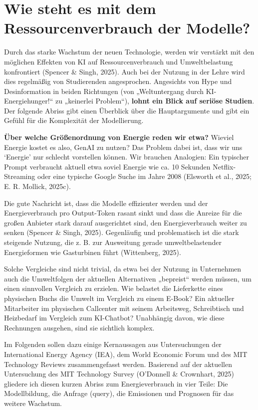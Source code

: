 \documentclass[
  ngerman,
  letterpaper,
  DIV=11]{scrreprt}
\begin{document}
\section{Wie steht es mit dem Ressourcenverbrauch der
Modelle?}\label{sec-energy}

Durch das starke Wachstum der neuen Technologie, werden wir verstärkt
mit den möglichen Effekten von KI auf Ressourcenverbrauch und
Umweltbelastung konfrontiert (Spencer \& Singh, 2025). Auch bei der
Nutzung in der Lehre wird dies regelmäßig von Studierenden angesprochen.
Angesichts von Hype und Desinformation in beiden Richtungen (von
„Weltuntergang durch KI-Energiehunger!{}`` zu „keinerlei Problem``),
\textbf{lohnt ein Blick auf seriöse Studien}. Der folgende Abriss gibt
einen Überblick über die Hauptargumente und gibt ein Gefühl für die
Komplexität der Modellierung.

\textbf{Über welche Größenordnung von Energie reden wir etwa?} Wieviel
Energie kostet es also, GenAI zu nutzen? Das Problem dabei ist, dass wir
uns `Energie' nur schlecht vorstellen können. Wir brauchen Analogien:
Ein typischer Prompt verbraucht aktuell etwa soviel Energie wie ca. 10
Sekunden Netflix-Streaming oder eine typische Google Suche im Jahre 2008
(Elsworth et al., 2025; E. R. Mollick, 2025c).

Die gute Nachricht ist, dass die Modelle effizienter werden und der
Energieverbrauch pro Output-Token rasant sinkt und dass die Anreize für
die großen Anbieter stark darauf ausgerichtet sind, den Energieverbrauch
weiter zu senken (Spencer \& Singh, 2025). Gegenläufig und problematisch
ist die stark steigende Nutzung, die z. B. zur Ausweitung gerade
umweltbelastender Energieformen wie Gasturbinen führt (Wittenberg,
2025).

Solche Vergleiche sind nicht trivial, da etwa bei der Nutzung in
Unternehmen auch die Umweltfolgen der aktuellen Alternativen „bepreist``
werden müssen, um einen sinnvollen Vergleich zu erzielen. Wie belastet
die Lieferkette eines physischen Buchs die Umwelt im Vergleich zu einem
E-Book? Ein aktueller Mitarbeiter im physischen Callcenter mit seinem
Arbeitsweg, Schreibtisch und Heizbedarf im Vergleich zum KI-Chatbot?
Unabhängig davon, wie diese Rechnungen ausgehen, sind sie sichtlich
komplex.

Im Folgenden sollen dazu einige Kernaussagen aus Untersuchungen der
International Energy Agency (IEA), dem World Economic Forum und des MIT
Technology Reviews zusammengefasst werden. Basierend auf der aktuellen
Untersuchung des MIT Technology Survey (O'Donnell \& Crownhart, 2025)
gliedere ich diesen kurzen Abriss zum Energieverbrauch in vier Teile:
Die Modellbildung, die Anfrage (query), die Emissionen und Prognosen für
das weitere Wachstum.
\end{document}
